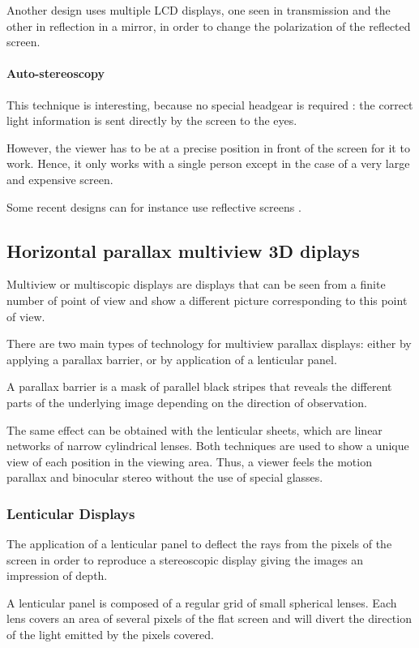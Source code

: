 Another design uses multiple LCD displays, one seen in transmission and the other in reflection in a mirror, in order to change the polarization of the reflected screen.

\paragraph{Auto-stereoscopy}
This technique is interesting, because no special headgear is required : the correct light information is sent directly by the screen to the eyes.

However, the viewer has to be at a precise position in front of the screen for it to work. Hence, it only works with a single person except in the case of a very large and expensive screen.

Some recent designs can for instance use reflective screens \cite{smithwick2013autostereoscopic}.

\subsection{Horizontal parallax multiview 3D diplays}
Multiview or multiscopic displays are displays that can be seen from a finite number of point of view and show a different picture corresponding to this point of view.

There are two main types of technology for multiview parallax displays: either by applying a parallax barrier, or by application of a lenticular panel.

A parallax barrier is a mask of parallel black stripes that reveals the different parts of the underlying image depending on the direction of observation.

The same effect can be obtained with the lenticular sheets, which are linear networks of narrow cylindrical lenses. Both techniques are used to show a unique view of each position in the viewing area. Thus, a viewer feels the motion parallax and binocular stereo without the use of special glasses. 

\subsubsection{Lenticular Displays}
The application of a lenticular panel to deflect the rays from the pixels of the screen in order to reproduce a stereoscopic display giving the images an impression of depth.

A lenticular panel is composed of a regular grid of small spherical lenses. Each lens covers an area of several pixels of the flat screen and will divert the direction of the light emitted by the pixels covered.

